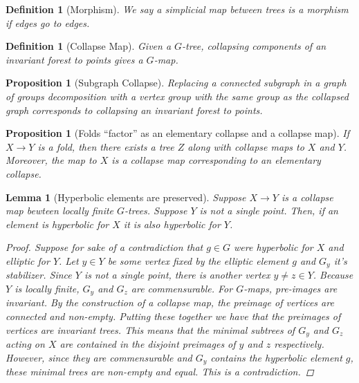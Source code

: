 \documentclass{article}
\theoremstyle{mystyle}
\newtheorem{lem}[thm]{Lemma}
\newtheorem{pro}[thm]{Proposition}
\newtheorem{defn}[thm]{Definition}
\theoremstyle{remark}
\begin{document}
\begin{defn}
    [Morphism]
    We say a simplicial map between trees is a morphism if edges go to edges.
\end{defn}

\begin{defn}
    [Collapse Map]
    Given a \(G\)-tree, collapsing components of an invariant forest to points gives a \(G\)-map.
\end{defn}
\begin{pro}
    [Subgraph Collapse]
    Replacing a connected subgraph in a graph of groups decomposition with a vertex group with the same group as the collapsed graph corresponds to collapsing an invariant forest to points.
\end{pro}

\begin{pro}
    [Folds ``factor'' as an elementary collapse and a collapse map]
    \label{pro:foldfactor} 
    If \(X \to Y\) is a fold, then there exists a tree \(Z\) along with collapse maps to \(X\) and
\(Y\). Moreover, the map to \(X\) is a collapse map corresponding to an elementary collapse.
\end{pro}

\begin{lem}
    [Hyperbolic elements are preserved]
    \label{lem:promoteelliptic} 
    Suppose \(X \to Y\) is a collapse map bewteen locally finite \(G\)-trees. Suppose \(Y\) is not a single point. Then, if an element is hyperbolic for \(X\) it is also hyperbolic for \(Y\).
    \begin{proof}
        Suppose for sake of a contradiction that \(g\in G\) were hyperbolic for \(X\) and elliptic for \(Y\). Let \(y \in Y\) be some vertex fixed by the elliptic element \(g\) and \(G_y\) it's stabilizer. Since \(Y\) is not a single point, there is another vertex \(y\neq z \in Y\). Because \(Y\) is locally finite, \(G_y\) and \(G_z\) are commensurable. For \(G\)-maps, pre-images are invariant. By the construction of a collapse map, the preimage of vertices are connected and non-empty. Putting these together we have that the preimages of vertices are invariant trees. This means that the minimal subtrees of \(G_y\) and \(G_z\) acting on \(X\) are contained in the disjoint preimages of \(y\) and \(z\) respectively. However, since they are commensurable and \(G_y\) contains the hyperbolic element \(g\), these minimal trees are non-empty and equal. This is a contradiction.
    \end{proof}
\end{lem}
\end{document}
